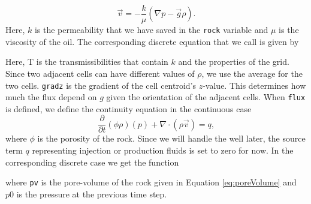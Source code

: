 \begin{equation*}
    \vec{v} = - \frac{k}{\mu}(\nabla p - \vec{g}\rho).
    \label{eq:pressSolverDarcy}
\end{equation*}
Here, $k$ is the permeability that we have saved in the \texttt{rock} variable and $\mu$ is the viscosity of the oil.
The corresponding discrete equation that we call  is given by 

Here, T is the transmissibilities that contain $k$ and the properties of the grid. Since two adjacent cells can have different values of $\rho$, we use the  average for the two cells. \texttt{gradz} is the gradient of the cell centroid's $z$-value. This determines how much the flux depend on $g$ given the orientation of the adjacent cells. When \texttt{flux} is defined, we define the continuity equation in the continuous case
\begin{equation*}
    \frac{\partial}{\partial t}(\phi\rho)(p) + \nabla\cdot(\rho\vec{v}) = q,
\end{equation*}
where $\phi$ is the porosity of the rock. Since we will handle the well later, the source term $q$ representing injection or production fluids is set to zero for now. In the corresponding discrete case we get the function

where \texttt{pv} is the pore-volume of the rock given in Equation \eqref{eq:poreVolume} and $p0$ is the pressure at the previous time step. 

